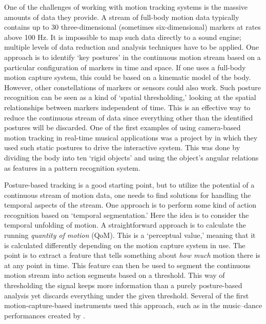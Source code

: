 One of the challenges of working with motion tracking systems is the massive amounts of data they provide. A stream of full-body motion data typically contains up to 30 three-dimensional (sometimes six-dimensional) markers at rates above 100 Hz. It is impossible to map such data directly to a sound engine; multiple levels of data reduction and analysis techniques have to be applied. One approach is to identify `key postures' in the continuous motion stream based on a particular configuration of markers in time and space. If one uses a full-body motion capture system, this could be based on a kinematic model of the body. However, other constellations of markers or sensors could also work. Such posture recognition can be seen as a kind of `spatial thresholding,' looking at the spatial relationships between markers independent of time. This is an effective way to reduce the continuous stream of data since everything other than the identified postures will be discarded. One of the first examples of using camera-based motion tracking in real-time musical applications was a project by \citet{gang_qian_gesture-driven_2004} in which they used such static postures to drive the interactive system. This was done by dividing the body into ten `rigid objects' and using the object's angular relations as features in a pattern recognition system.

Posture-based tracking is a good starting point, but to utilize the potential of a continuous stream of motion data, one needs to find solutions for handling the temporal aspects of the stream. One approach is to perform some kind of action recognition based on `temporal segmentation.' Here the idea is to consider the temporal unfolding of motion. A straightforward approach is to calculate the running \emph{quantity of motion} (QoM). This is a `perceptual value,' meaning that it is calculated differently depending on the motion capture system in use. The point is to extract a feature that tells something about \emph{how much} motion there is at any point in time. This feature can then be used to segment the continuous motion stream into action segments based on a threshold. This way of thresholding the signal keeps more information than a purely posture-based analysis yet discards everything under the given threshold. Several of the first motion-capture-based instruments used this approach, such as in the music--dance performances created by \citet{dobrian_gestural_2003}.

